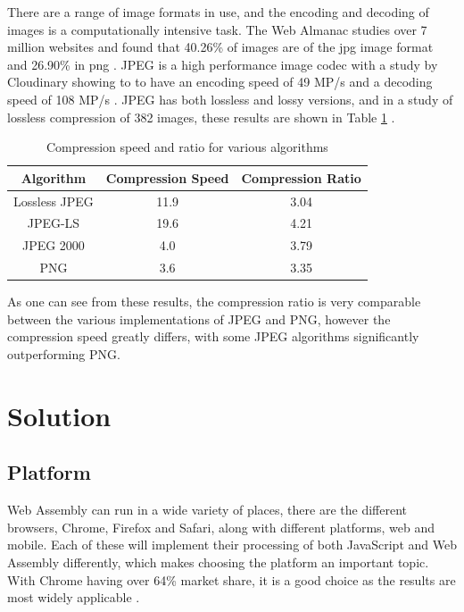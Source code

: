 \documentclass[12pt,a4paper]{article}
\begin{document}
There are a range of image formats in use, and the encoding and decoding of images is a computationally intensive task. The Web Almanac studies over 7 million websites and found that 40.26\% of images are of the jpg image format and 26.90\% in png \cite{webalmanac}. JPEG is a high performance image codec with a study by Cloudinary showing to to have an encoding speed of 49 MP/s and a decoding speed of 108 MP/s \cite{cloudinary}. JPEG has both lossless and lossy versions, and in a study of lossless compression of 382 images, these results are shown in Table \ref{speedratio} \cite{ukrit2011survey}.


\begin{table}[H]
    \centering
    \caption{Compression speed and ratio for various algorithms}
    \vspace*{6pt}
    \label{speedratio}
    \begin{tabular}{ccc}\hline\hline
        Algorithm     & Compression Speed & Compression Ratio \\ \hline
        Lossless JPEG & 11.9              & 3.04              \\
        JPEG-LS       & 19.6              & 4.21              \\
        JPEG 2000     & 4.0               & 3.79              \\
        PNG           & 3.6               & 3.35              \\
    \end{tabular}
\end{table}

As one can see from these results, the compression ratio is very comparable between the various implementations of JPEG and PNG, however the compression speed greatly differs, with some JPEG algorithms significantly outperforming PNG.


\section{Solution}

\subsection{Platform}

Web Assembly can run in a wide variety of places, there are the different browsers, Chrome, Firefox and Safari, along with different platforms, web and mobile. Each of these will implement their processing of both JavaScript and Web Assembly differently, which makes choosing the platform an important topic. With Chrome having over 64\% market share, it is a good choice as the results are most widely applicable \cite{webmarketshare}.
\end{document}
